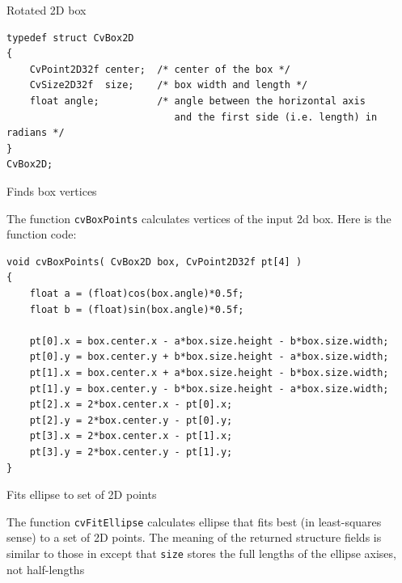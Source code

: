 \label{CvBox2D}

Rotated 2D box

\begin{lstlisting}
typedef struct CvBox2D
{
    CvPoint2D32f center;  /* center of the box */
    CvSize2D32f  size;    /* box width and length */
    float angle;          /* angle between the horizontal axis
                             and the first side (i.e. length) in radians */
}
CvBox2D;
\end{lstlisting}

\label{BoxPoints}

Finds box vertices


\begin{description}
\end{description}

The function \texttt{cvBoxPoints} calculates vertices of the input 2d box. Here is the function code:

\begin{lstlisting}
void cvBoxPoints( CvBox2D box, CvPoint2D32f pt[4] )
{
    float a = (float)cos(box.angle)*0.5f;
    float b = (float)sin(box.angle)*0.5f;

    pt[0].x = box.center.x - a*box.size.height - b*box.size.width;
    pt[0].y = box.center.y + b*box.size.height - a*box.size.width;
    pt[1].x = box.center.x + a*box.size.height - b*box.size.width;
    pt[1].y = box.center.y - b*box.size.height - a*box.size.width;
    pt[2].x = 2*box.center.x - pt[0].x;
    pt[2].y = 2*box.center.y - pt[0].y;
    pt[3].x = 2*box.center.x - pt[1].x;
    pt[3].y = 2*box.center.y - pt[1].y;
}
\end{lstlisting}

\label{FitEllipse}

Fits ellipse to set of 2D points


\begin{description}
\end{description}

The function \texttt{cvFitEllipse} calculates ellipse that fits best
(in least-squares sense) to a set of 2D points. The meaning of the
returned structure fields is similar to those in  except
that \texttt{size} stores the full lengths of the ellipse axises,
not half-lengths

